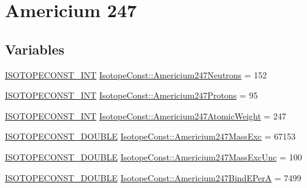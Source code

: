 \hypertarget{group___isotope_const-_americium-_am247}{}\section{Americium 247}
\label{group___isotope_const-_americium-_am247}
\subsection*{Variables}
\begin{DoxyCompactItemize}
\item 
\mbox{\hyperlink{group___isotope_const-_macros_ga5f18360b3e99483a35c32d789e62621c}{I\+S\+O\+T\+O\+P\+E\+C\+O\+N\+S\+T\+\_\+\+I\+NT}} \mbox{\hyperlink{group___isotope_const-_americium-_am247_gaae3669d113db8a99e1f7cdb9d22f05de}{Isotope\+Const\+::\+Americium247\+Neutrons}} = 152
\item 
\mbox{\hyperlink{group___isotope_const-_macros_ga5f18360b3e99483a35c32d789e62621c}{I\+S\+O\+T\+O\+P\+E\+C\+O\+N\+S\+T\+\_\+\+I\+NT}} \mbox{\hyperlink{group___isotope_const-_americium-_am247_gab0b80c2e6ac476efd8f9adf2c1fe9b98}{Isotope\+Const\+::\+Americium247\+Protons}} = 95
\item 
\mbox{\hyperlink{group___isotope_const-_macros_ga5f18360b3e99483a35c32d789e62621c}{I\+S\+O\+T\+O\+P\+E\+C\+O\+N\+S\+T\+\_\+\+I\+NT}} \mbox{\hyperlink{group___isotope_const-_americium-_am247_ga7f8a36da275b2fb911dd5264de95107e}{Isotope\+Const\+::\+Americium247\+Atomic\+Weight}} = 247
\item 
\mbox{\hyperlink{group___isotope_const-_macros_ga8f45a7272ce02c0b4c65c44636ed719a}{I\+S\+O\+T\+O\+P\+E\+C\+O\+N\+S\+T\+\_\+\+D\+O\+U\+B\+LE}} \mbox{\hyperlink{group___isotope_const-_americium-_am247_gab519cf6d097ce0758f6f33c628a9345c}{Isotope\+Const\+::\+Americium247\+Mass\+Exc}} = 67153
\item 
\mbox{\hyperlink{group___isotope_const-_macros_ga8f45a7272ce02c0b4c65c44636ed719a}{I\+S\+O\+T\+O\+P\+E\+C\+O\+N\+S\+T\+\_\+\+D\+O\+U\+B\+LE}} \mbox{\hyperlink{group___isotope_const-_americium-_am247_ga8608fd19550b42295250cd262cdbc231}{Isotope\+Const\+::\+Americium247\+Mass\+Exc\+Unc}} = 100
\item 
\mbox{\hyperlink{group___isotope_const-_macros_ga8f45a7272ce02c0b4c65c44636ed719a}{I\+S\+O\+T\+O\+P\+E\+C\+O\+N\+S\+T\+\_\+\+D\+O\+U\+B\+LE}} \mbox{\hyperlink{group___isotope_const-_americium-_am247_gafb64412f490e26aac3f09e3d6416cc08}{Isotope\+Const\+::\+Americium247\+Bind\+E\+PerA}} = 7499
\item 

\end{DoxyCompactItemize}
